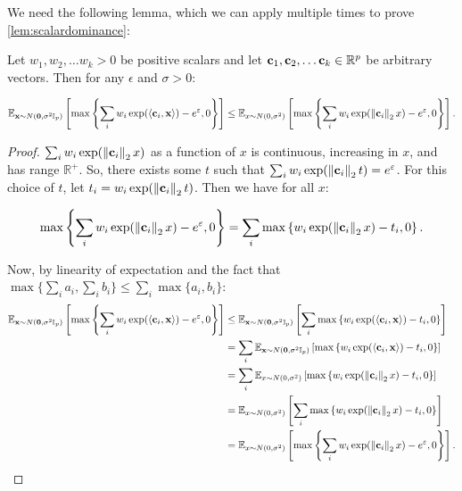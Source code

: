 We need  the following lemma, which we can apply multiple times to prove \cref{lem:scalardominance}:

\begin{lem}\label{lem:sumofmaxes}
Let $w_1, w_2, \ldots w_k > 0$ be positive scalars and let $\mathbf{c}_1, \mathbf{c}_2, \ldots \mathbf{c}_k \in \mathbb{R}^p$ be arbitrary vectors. Then for any $\epsilon$ and $\sigma > 0$:

\[\mathbb{E}_{\mathbf{x} \sim N(\boldsymbol{0}, \sigma^2 \mathbb{I}_p)}\left[\max\left\{\sum_i w_i \exp(\langle \mathbf{c}_i, \mathbf{x}\rangle) - e^\varepsilon, 0\right\} \right] \leq \mathbb{E}_{x \sim N(0, \sigma^2)}\left[\max\left\{\sum_i w_i \exp(\left\|\mathbf{c}_i\right\|_2 x) - e^\varepsilon, 0\right\} \right].\]
\end{lem}
\begin{proof}
$\sum_i w_i \exp(\left\|\mathbf{c}_i\right\|_2 x)$ as a function of $x$ is continuous, increasing in $x$, and has range $\mathbb{R}^+$. So, there exists some $t$ such that $\sum_i w_i \exp(\left\|\mathbf{c}_i\right\|_2 t) = e^\varepsilon$. For this choice of $t$, let $t_i = w_i \exp(\left\|\mathbf{c}_i\right\|_2 t)$. Then we have for all $x$:

\[\max\left\{\sum_i w_i \exp(\left\|\mathbf{c}_i\right\|_2 x) - e^\varepsilon, 0\right\} = \sum_i \max\left\{w_i \exp(\left\|\mathbf{c}_i\right\|_2 x) - t_i, 0\right\}.\]

Now, by linearity of expectation and the fact that $\max\{\sum_i a_i, \sum_i b_i\} \leq \sum_i \max\{a_i, b_i\}$:
\begin{align*}
\mathbb{E}_{\mathbf{x} \sim N(\boldsymbol{0}, \sigma^2 \mathbb{I}_p)}\left[\max\left\{\sum_i w_i \exp(\langle \mathbf{c}_i, \mathbf{x}\rangle) - e^\varepsilon, 0\right\} \right] &\leq \mathbb{E}_{\mathbf{x} \sim N(\boldsymbol{0}, \sigma^2 \mathbb{I}_p)}\left[\sum_i \max\left\{w_i \exp(\langle \mathbf{c}_i, \mathbf{x}\rangle) - t_i, 0\right\} \right]\\
& = \sum_i \mathbb{E}_{\mathbf{x} \sim N(\boldsymbol{0}, \sigma^2 \mathbb{I}_p)}\left[\max\left\{w_i \exp(\langle \mathbf{c}_i, \mathbf{x}\rangle) - t_i, 0\right\} \right]\\
& = \sum_i \mathbb{E}_{x \sim N(0, \sigma^2)}\left[\max\left\{w_i \exp(\left\|\mathbf{c}_i\right\|_2 x) - t_i, 0\right\} \right]\\
& = \mathbb{E}_{x \sim N(0, \sigma^2)}\left[\sum_i \max\left\{w_i \exp(\left\|\mathbf{c}_i\right\|_2 x) - t_i, 0\right\} \right]\\
& = \mathbb{E}_{x \sim N(0, \sigma^2)}\left[\max\left\{\sum_i w_i \exp(\left\|\mathbf{c}_i\right\|_2 x) - e^\varepsilon, 0\right\} \right].
\end{align*}
\end{proof}

